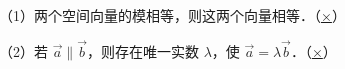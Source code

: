 \documentclass[fontset=none]{ctexart}
\begin{document}
\hsize=86.26mm
\noindent（1）两个空间向量的模相等，则这两个向量相等．\hfill（\underline{×}）\hspace*{5.4mm}\par
\noindent（2）若 \(\overrightarrow{a}\parallel\overrightarrow{b}\)，则存在唯一实数 \(\lambda\)，使 \(\overrightarrow{a}=\lambda\overrightarrow{b}\)．\hfill（\underline{×}）\hspace*{5.4mm}\par
\end{document}
